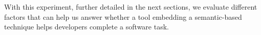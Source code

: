  

With this experiment, further detailed in the next sections, we evaluate different factors that can help us answer whether 
a tool embedding a semantic-based technique helps developers complete a software task. 

















